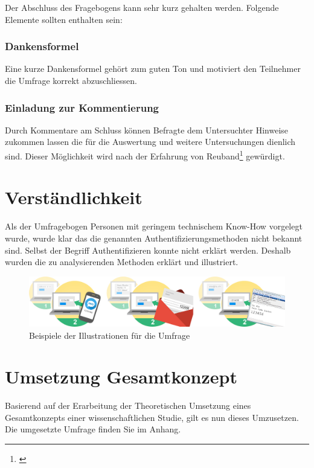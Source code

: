 Der Abschluss des Fragebogens kann sehr kurz gehalten werden. Folgende
Elemente sollten enthalten sein:

\subsubsection{Dankensformel}\label{dankensformel}

Eine kurze Dankensformel gehört zum guten Ton und motiviert den
Teilnehmer die Umfrage korrekt abzuschliessen.

\subsubsection{Einladung zur
Kommentierung}\label{einladung-zur-kommentierung}

Durch Kommentare am Schluss können Befragte dem Untersuchter Hinweise
zukommen lassen die für die Auswertung und weitere Untersuchungen
dienlich sind. Dieser Möglichkeit wird nach der Erfahrung von
Reuband\footnote{\autocite{kzfss01}} gewürdigt.

\section{Verständlichkeit}\label{verstuxe4ndlichkeit}

Als der Umfragebogen Personen mit geringem technischem Know-How
vorgelegt wurde, wurde klar das die genannten Authentifizierungsmethoden
nicht bekannt sind. Selbst der Begriff Authentifizieren konnte nicht
erklärt werden. Deshalb wurden die zu analysierenden Methoden erklärt
und illustriert.

\begin{figure}[htbp]
\centering
\includegraphics{images/studien-ilustrationen.jpg}
\caption{Beispiele der Illustrationen für die Umfrage}
\end{figure}

\section{Umsetzung Gesamtkonzept}\label{umsetzung-gesamtkonzept}

Basierend auf der Erarbeitung der Theoretischen Umsetzung eines
Gesamtkonzepts einer wissenschaftlichen Studie, gilt es nun dieses
Umzusetzen. Die umgesetzte Umfrage finden Sie im Anhang.

